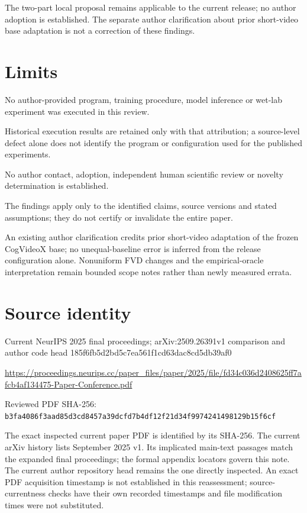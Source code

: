 \documentclass[11pt]{article}
\begin{document}
The two-part local proposal remains applicable to the current release; no author adoption is established. The separate author clarification about prior short-video base adaptation is not a correction of these findings.

\section*{Limits}

No author-provided program, training procedure, model inference or wet-lab experiment was executed in this review.\par

Historical execution results are retained only with that attribution; a source-level defect alone does not identify the program or configuration used for the published experiments.\par

No author contact, adoption, independent human scientific review or novelty determination is established.\par

The findings apply only to the identified claims, source versions and stated assumptions; they do not certify or invalidate the entire paper.\par

An existing author clarification credits prior short-video adaptation of the frozen CogVideoX base; no unequal-baseline error is inferred from the release configuration alone. Nonuniform FVD changes and the empirical-oracle interpretation remain bounded scope notes rather than newly measured errata.\par

\section*{Source identity}

Current NeurIPS 2025 final proceedings; arXiv:2509.26391v1 comparison and author code head 185f6fb5d2bd5c7ea561f1cd63dac8cd5db39af0

\url{https://proceedings.neurips.cc/paper_files/paper/2025/file/fd34c036d2408625ff7afcb4af134475-Paper-Conference.pdf}

Reviewed PDF SHA-256: \nolinkurl{b3fa4086f3aad85d3cd8457a39dcfd7b4df12f21d34f9974241498129b15f6cf}

The exact inspected current paper PDF is identified by its SHA-256. The current arXiv history lists September 2025 v1. Its implicated main-text passages match the expanded final proceedings; the formal appendix locators govern this note. The current author repository head remains the one directly inspected. An exact PDF acquisition timestamp is not established in this reassessment; source-currentness checks have their own recorded timestamps and file modification times were not substituted.
\end{document}
